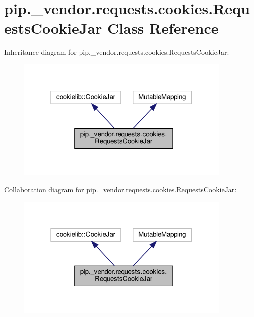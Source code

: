 \hypertarget{classpip_1_1__vendor_1_1requests_1_1cookies_1_1RequestsCookieJar}{}\section{pip.\+\_\+vendor.\+requests.\+cookies.\+Requests\+Cookie\+Jar Class Reference}
\label{classpip_1_1__vendor_1_1requests_1_1cookies_1_1RequestsCookieJar}


Inheritance diagram for pip.\+\_\+vendor.\+requests.\+cookies.\+Requests\+Cookie\+Jar\+:
\nopagebreak
\begin{figure}[H]
\begin{center}
\leavevmode
\includegraphics[width=292pt]{classpip_1_1__vendor_1_1requests_1_1cookies_1_1RequestsCookieJar__inherit__graph}
\end{center}
\end{figure}


Collaboration diagram for pip.\+\_\+vendor.\+requests.\+cookies.\+Requests\+Cookie\+Jar\+:
\nopagebreak
\begin{figure}[H]
\begin{center}
\leavevmode
\includegraphics[width=292pt]{classpip_1_1__vendor_1_1requests_1_1cookies_1_1RequestsCookieJar__coll__graph}
\end{center}
\end{figure}
